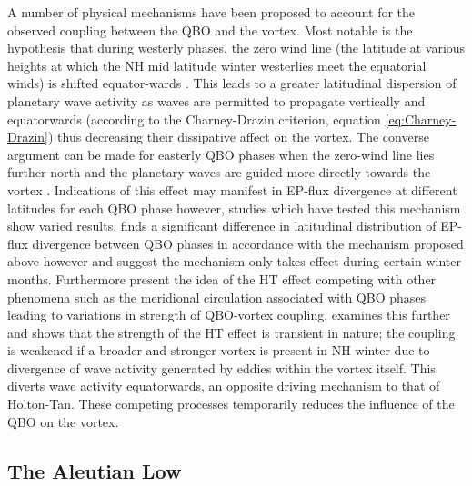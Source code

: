 {A number of physical mechanisms have been proposed to account for the observed coupling between the QBO and the vortex. Most notable is the hypothesis that during westerly phases, the zero wind line (the latitude at various heights at which the NH mid latitude winter westerlies meet the equatorial winds) is shifted equator-wards \citep{HoltonJamesRTan1980}. This leads to a greater latitudinal dispersion of planetary wave activity as waves are permitted to propagate vertically and equatorwards (according to the Charney-Drazin criterion, equation \ref{eq:Charney-Drazin}) thus decreasing their dissipative affect on the vortex. The converse argument can be made for easterly QBO phases when the zero-wind line lies further north and the planetary waves are guided more directly towards the vortex \cite{luMechanisms2014}. Indications of this effect may manifest in EP-flux divergence at different latitudes for each QBO phase however, studies which have tested this mechanism show varied results. \cite{Hamilton} finds a significant difference in latitudinal distribution of EP-flux divergence between QBO phases in accordance with the mechanism proposed above however \cite{Hu2002} and \cite{Gray2004} suggest the mechanism only takes effect during certain winter months. Furthermore \citep{Garfinkel12} present the idea of the HT effect competing with other phenomena such as the meridional circulation associated with QBO phases leading to variations in strength of QBO-vortex coupling. \cite{luMechanisms2014} examines this further and shows that the strength of the HT effect is transient in nature; the coupling is weakened if a broader and stronger vortex is present in NH winter due to divergence of wave activity generated by eddies within the vortex itself. This diverts wave activity equatorwards, an opposite driving mechanism to that of Holton-Tan. These competing processes temporarily reduces the influence of the QBO on the vortex.

\subsection{The Aleutian Low}
\label{sec:external_influence_AL}

}
